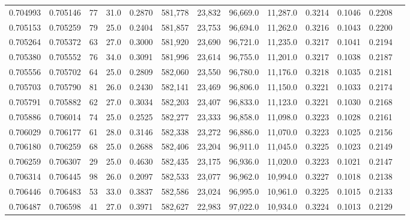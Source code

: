 \begin{tabular}{rrrrrrrrrrrrr}
0.704993 & 0.705146 &    77 & 31.0 &                                     0.2870 & 581,778 &  23,832 &  96,669.0 &  11,287.0 & 0.3214 & 0.1046 & 0.2208 \\
0.705153 & 0.705259 &    79 & 25.0 &                                     0.2404 & 581,857 &  23,753 &  96,694.0 &  11,262.0 & 0.3216 & 0.1043 & 0.2200 \\
0.705264 & 0.705372 &    63 & 27.0 &                                     0.3000 & 581,920 &  23,690 &  96,721.0 &  11,235.0 & 0.3217 & 0.1041 & 0.2194 \\
0.705380 & 0.705552 &    76 & 34.0 &                                     0.3091 & 581,996 &  23,614 &  96,755.0 &  11,201.0 & 0.3217 & 0.1038 & 0.2187 \\
0.705556 & 0.705702 &    64 & 25.0 &                                     0.2809 & 582,060 &  23,550 &  96,780.0 &  11,176.0 & 0.3218 & 0.1035 & 0.2181 \\
0.705703 & 0.705790 &    81 & 26.0 &                                     0.2430 & 582,141 &  23,469 &  96,806.0 &  11,150.0 & 0.3221 & 0.1033 & 0.2174 \\
0.705791 & 0.705882 &    62 & 27.0 &                                     0.3034 & 582,203 &  23,407 &  96,833.0 &  11,123.0 & 0.3221 & 0.1030 & 0.2168 \\
0.705886 & 0.706014 &    74 & 25.0 &                                     0.2525 & 582,277 &  23,333 &  96,858.0 &  11,098.0 & 0.3223 & 0.1028 & 0.2161 \\
0.706029 & 0.706177 &    61 & 28.0 &                                     0.3146 & 582,338 &  23,272 &  96,886.0 &  11,070.0 & 0.3223 & 0.1025 & 0.2156 \\
0.706180 & 0.706259 &    68 & 25.0 &                                     0.2688 & 582,406 &  23,204 &  96,911.0 &  11,045.0 & 0.3225 & 0.1023 & 0.2149 \\
0.706259 & 0.706307 &    29 & 25.0 &                                     0.4630 & 582,435 &  23,175 &  96,936.0 &  11,020.0 & 0.3223 & 0.1021 & 0.2147 \\
0.706314 & 0.706445 &    98 & 26.0 &                                     0.2097 & 582,533 &  23,077 &  96,962.0 &  10,994.0 & 0.3227 & 0.1018 & 0.2138 \\
0.706446 & 0.706483 &    53 & 33.0 &                                     0.3837 & 582,586 &  23,024 &  96,995.0 &  10,961.0 & 0.3225 & 0.1015 & 0.2133 \\
0.706487 & 0.706598 &    41 & 27.0 &                                     0.3971 & 582,627 &  22,983 &  97,022.0 &  10,934.0 & 0.3224 & 0.1013 & 0.2129 \\

\end{tabular}
